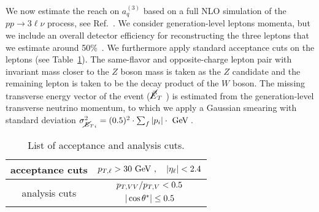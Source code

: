 We now estimate the reach on $a_q^{(3)}$ based on a full NLO simulation of the $pp \to 3\ell\nu$ process, see Ref.~\cite{Franceschini:2017ab}. %
We consider generation-level leptons momenta, but we include an overall detector efficiency for reconstructing the three leptons that we estimate around 50\%~\cite{ATLAS:2016iqc}. We furthermore apply standard acceptance cuts on the leptons (see Table~\ref{tab:cuts}).
The same-flavor and opposite-charge lepton pair with invariant mass closer to the $Z$ boson mass is taken as the $Z$ candidate and the remaining lepton  is taken to be the decay product of the $W$ boson. The missing transverse energy vector of the event ($\cancel{\vec{E}}_T$ ) is estimated from the generation-level transverse neutrino momentum, to which we apply a Gaussian smearing with standard deviation
$ \sigma_{{\met}_{i}}^2 = (0.5)^2 \cdot \sum_f |p_i| \cdot {\rm{\UGeV}}\,$.

\begin{table}
\centering
\begin{tabular}{c|c}
acceptance cuts &
$p_{T,\ell}>30 ~\text{GeV} \ ,\quad |\eta_{\ell}|<2.4$\\
\hline
\multirow{2}{*}{analysis cuts} &
$\deltapt/p_{T,V}<%
0.5$\\
& $|\cos \thetastar| \leq %
0.5$
\end{tabular}
\caption{List of acceptance and analysis cuts.}\label{tab:cuts}
\end{table}

